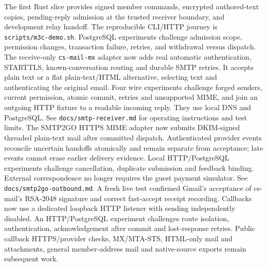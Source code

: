 \documentclass[11pt]{article}
\begin{document}
The first Rust slice provides signed member commands, encrypted authored-text
copies, pending-reply admission at the trusted receiver boundary, and development
relay handoff. The reproducible CLI/HTTP journey is \texttt{scripts/m3c-demo.sh}. PostgreSQL experiments challenge admission scope, permission changes,
transaction failure, retries, and withdrawal versus dispatch. The receive-only
\texttt{cs-mail-mx} adapter now adds real automatic authentication, STARTTLS,
known-conversation routing and durable SMTP retries. It accepts plain text or a
flat plain-text/HTML alternative, selecting text and authenticating the original
email. Four wire experiments challenge forged senders, current permission, atomic
commit, retries and unsupported MIME, and join an outgoing HTTP fixture to a
readable incoming reply. They use local DNS and PostgreSQL. See
\texttt{docs/smtp-receiver.md} for operating instructions and test limits.
The SMTP2GO HTTPS MIME adapter now submits DKIM-signed threaded plain-text mail
after committed dispatch. Authenticated provider events reconcile uncertain
handoffs atomically and remain separate from acceptance; late events cannot erase
earlier delivery evidence. Local HTTP/PostgreSQL experiments challenge cancellation,
duplicate submission and feedback binding. External correspondence no longer
requires the guest payment simulator. See \texttt{docs/smtp2go-outbound.md}.
A fresh live test confirmed Gmail's acceptance of cs-mail's RSA-2048 signature and
correct fast-accept receipt recording. Callbacks now use a dedicated loopback HTTP
listener with sending independently disabled. An HTTP/PostgreSQL experiment challenges
route isolation, authentication, acknowledgement after commit and lost-response retries.
Public callback HTTPS/provider checks, MX/MTA-STS, HTML-only mail and attachments,
general member-address mail and native-source exports remain subsequent work.
\end{document}
